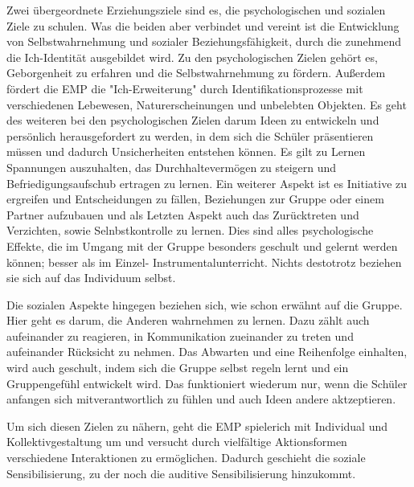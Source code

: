 Zwei übergeordnete Erziehungsziele sind es, die psychologischen und sozialen
Ziele zu schulen. Was die beiden aber verbindet und vereint ist die Entwicklung
von Selbstwahrnehmung und sozialer Beziehungsfähigkeit, durch die zunehmend die
Ich-Identität ausgebildet wird. Zu den psychologischen Zielen gehört es, Geborgenheit zu
erfahren und die Selbstwahrnehmung zu fördern. Außerdem fördert die EMP die
"Ich-Erweiterung" durch Identifikationsprozesse mit verschiedenen Lebewesen,
Naturerscheinungen und unbelebten Objekten. Es geht des weiteren bei den
psychologischen Zielen darum Ideen zu entwickeln und persönlich herausgefordert
zu werden, in dem sich die Schüler präsentieren müssen und dadurch
Unsicherheiten entstehen können. Es gilt zu Lernen Spannungen auszuhalten, das
Durchhaltevermögen zu steigern und Befriedigungsaufschub ertragen zu lernen. Ein
weiterer Aspekt ist es Initiative zu ergreifen und Entscheidungen zu fällen,
Beziehungen zur Gruppe oder einem Partner aufzubauen und als Letzten Aspekt auch das
Zurücktreten und Verzichten, sowie Selnbstkontrolle zu lernen. 
Dies sind alles psychologische Effekte, die im Umgang mit der Gruppe besonders
geschult und gelernt werden können; besser als im Einzel-
Instrumentalunterricht. Nichts destotrotz beziehen sie sich auf das Individuum selbst.

Die sozialen Aspekte hingegen beziehen sich, wie schon erwähnt auf die Gruppe.
Hier geht es darum, die Anderen wahrnehmen zu lernen. Dazu zählt auch
aufeinander zu reagieren, in Kommunikation zueinander zu treten und aufeinander
Rücksicht zu nehmen. Das Abwarten und eine
Reihenfolge einhalten, wird auch geschult, indem sich die Gruppe selbst regeln
lernt und ein Gruppengefühl entwickelt wird. Das funktioniert wiederum nur, wenn
die Schüler anfangen sich mitverantwortlich zu fühlen und auch Ideen andere aktzeptieren.

Um sich diesen Zielen zu nähern, geht die EMP spielerich mit Individual und
Kollektivgestaltung um und versucht durch vielfältige Aktionsformen verschiedene
Interaktionen zu ermöglichen. Dadurch geschieht die soziale Sensibilisierung, zu
der noch die auditive Sensibilisierung hinzukommt. 



